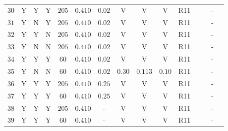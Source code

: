 \begin{center}
\begin{longtable}{@{\extracolsep{\fill}}ccccccccccccccc@{}}
\rule[-1ex]{0pt}{2.5ex} $30$ & Y & Y & Y & $205$ & $0.410$ & $0.02$ & V & V & V & R11 & \cite{Humphreys:2013eja} & \cite{Pietrzynski:2013gia} & - & \cite{vanLeeuwen:2007xw} \\
\rule[-1ex]{0pt}{2.5ex} $31$ & Y & N & Y & $205$ & $0.410$ & $0.02$ & V & V & V & R11 & \cite{Humphreys:2013eja} & \cite{Pietrzynski:2013gia} & - & \cite{vanLeeuwen:2007xw} \\
\rule[-1ex]{0pt}{2.5ex} $32$ & Y & Y & N & $205$ & $0.410$ & $0.02$ & V & V & V & R11 & \cite{Humphreys:2013eja} & \cite{Pietrzynski:2013gia} & - & \cite{vanLeeuwen:2007xw} \\
\rule[-1ex]{0pt}{2.5ex} $33$ & Y & N & N & $205$ & $0.410$ & $0.02$ & V & V & V & R11 & \cite{Humphreys:2013eja} & \cite{Pietrzynski:2013gia} & - & \cite{vanLeeuwen:2007xw} \\
\rule[-1ex]{0pt}{2.5ex} $34$ & Y & Y & Y & $60$ & $0.410$ & $0.02$ & V & V & V & R11 & \cite{Humphreys:2013eja} & \cite{Pietrzynski:2013gia} & - & \cite{vanLeeuwen:2007xw} \\
\rule[-1ex]{0pt}{2.5ex} $35$ & Y & N & N & $60$ & $0.410$ & $0.02$ & $0.30$ & $0.113$ & $0.10$ & R11 & \cite{Humphreys:2013eja} & \cite{Pietrzynski:2013gia} & - & \cite{vanLeeuwen:2007xw} \\
\rule[-1ex]{0pt}{2.5ex} $36$ & Y & Y & Y & $205$ & $0.410$ & $0.25$ & V & V & V & R11 & \cite{Humphreys:2013eja} & \cite{Pietrzynski:2013gia} & - & \cite{vanLeeuwen:2007xw} \\
\rule[-1ex]{0pt}{2.5ex} $37$ & Y & Y & Y & $60$ & $0.410$ & $0.25$ & V & V & V & R11 & \cite{Humphreys:2013eja} & \cite{Pietrzynski:2013gia} & - & \cite{vanLeeuwen:2007xw} \\
\rule[-1ex]{0pt}{2.5ex} $38$ & Y & Y & Y & $205$ & $0.410$ & - & V & V & V & R11 & \cite{Humphreys:2013eja} & \cite{Pietrzynski:2013gia} & - & \cite{vanLeeuwen:2007xw} \\
\rule[-1ex]{0pt}{2.5ex} $39$ & Y & Y & Y & $60$ & $0.410$ & - & V & V & V & R11 & \cite{Humphreys:2013eja} & \cite{Pietrzynski:2013gia} & - & \cite{vanLeeuwen:2007xw} \\ 


\end{longtable}
\end{center}
